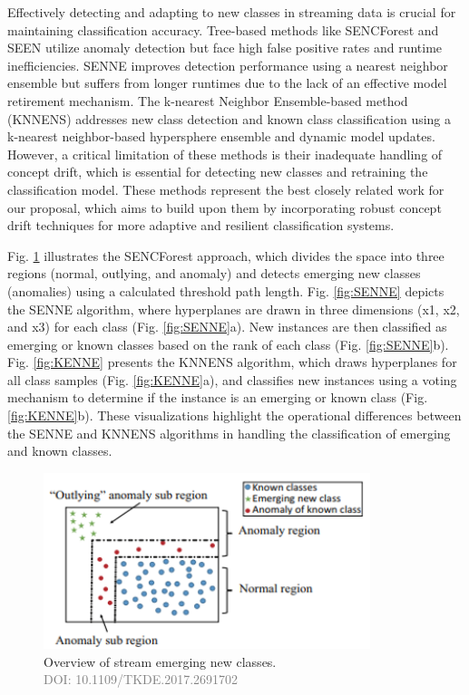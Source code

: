 Effectively detecting and adapting to new classes in streaming data is crucial for maintaining classification accuracy. Tree-based methods like SENCForest and SEEN utilize anomaly detection but face high false positive rates and runtime inefficiencies. SENNE improves detection performance using a nearest neighbor ensemble but suffers from longer runtimes due to the lack of an effective model retirement mechanism. The k-nearest Neighbor Ensemble-based method (KNNENS) addresses new class detection and known class classification using a k-nearest neighbor-based hypersphere ensemble and dynamic model updates. However, a critical limitation of these methods is their inadequate handling of concept drift, which is essential for detecting new classes and retraining the classification model. These methods represent the best closely related work for our proposal, which aims to build upon them by incorporating robust concept drift techniques for more adaptive and resilient classification systems.

Fig. \ref{fig:SENCForest} illustrates the SENCForest approach, which divides the space into three regions (normal, outlying, and anomaly) and detects emerging new classes (anomalies) using a calculated threshold path length. Fig. \ref{fig:SENNE} depicts the SENNE algorithm, where hyperplanes are drawn in three dimensions (x1, x2, and x3) for each class (Fig. \ref{fig:SENNE}a). New instances are then classified as emerging or known classes based on the rank of each class (Fig. \ref{fig:SENNE}b). Fig. \ref{fig:KENNE} presents the KNNENS algorithm, which draws hyperplanes for all class samples (Fig. \ref{fig:KENNE}a), and classifies new instances using a voting mechanism to determine if the instance is an emerging or known class (Fig. \ref{fig:KENNE}b). These visualizations highlight the operational differences between the SENNE and KNNENS algorithms in handling the classification of emerging and known classes.

\begin{figure}[!ht]
    \centering
    \includegraphics[width=0.85\textwidth]{3_State-of-the-art/fig/SENCForst.png}
    \caption{Overview of stream emerging new classes. \\
    \textcolor{gray}{\fontsize{10}{0}\selectfont DOI: 10.1109/TKDE.2017.2691702}}
    \label{fig:SENCForest}
\end{figure}
    

